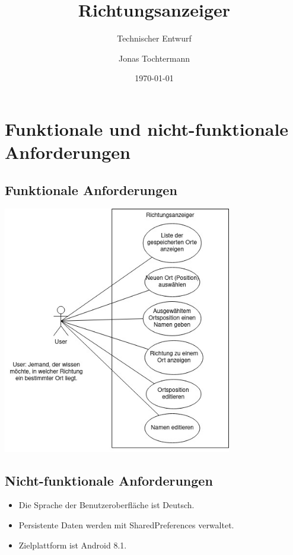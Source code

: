 \documentclass[12pt,a4paper]{scrartcl}
\title{Richtungsanzeiger}
\subtitle{Technischer Entwurf}
\author{Jonas Tochtermann}
\date{\today}
\begin{document}
\maketitle

\section{Funktionale und nicht-funktionale Anforderungen}

\subsection{Funktionale Anforderungen}

\includegraphics[width=10.0cm]{../UseCase.jpg}

\subsection{Nicht-funktionale Anforderungen}

\begin{itemize}
  \item Die Sprache der Benutzeroberfläche ist Deutsch.
  \item Persistente Daten werden mit SharedPreferences verwaltet.
  \item Zielplattform ist Android 8.1.
\end{itemize}

%
%
\end{document}
